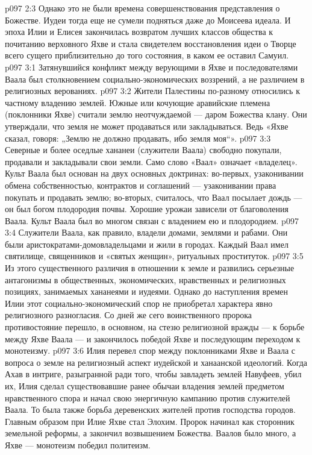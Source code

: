 \vs p097 2:3 Однако это не были времена совершенствования представления о Божестве. Иудеи тогда еще не сумели подняться даже до Моисеева идеала. И эпоха Илии и Елисея закончилась возвратом лучших классов общества к почитанию верховного Яхве и стала свидетелем восстановления идеи о Творце всего сущего приблизительно до того состояния, в каком ее оставил Самуил.
\vs p097 3:1 Затянувшийся конфликт между верующими в Яхве и последователями Ваала был столкновением социально\hyp{}экономических воззрений, а не различием в религиозных верованиях.
\vs p097 3:2 \pc Жители Палестины по\hyp{}разному относились к частному владению землей. Южные или кочующие аравийские племена (поклонники Яхве) считали землю неотчуждаемой --- даром Божества клану. Они утверждали, что земля не может продаваться или закладываться. Ведь «Яхве сказал, говоря: „Землю не должно продавать, ибо земля моя“».
\vs p097 3:3 Северные и более оседлые хананеи (служители Ваала) свободно покупали, продавали и закладывали свои земли. Само слово «Ваал» означает «владелец». Культ Ваала был основан на двух основных доктринах: во\hyp{}первых, узаконивании обмена собственностью, контрактов и соглашений --- узаконивании права покупать и продавать землю; во\hyp{}вторых, считалось, что Ваал посылает дождь --- он был богом плодородия почвы. Хорошие урожаи зависели от благоволения Ваала. Культ Ваала был во многом связан с  владением ею и плодородием.
\vs p097 3:4 Служители Ваала, как правило, владели домами, землями и рабами. Они были аристократами\hyp{}домовладельцами и жили в городах. Каждый Ваал имел святилище, священников и «святых женщин», ритуальных проституток.
\vs p097 3:5 Из этого существенного различия в отношении к земле и развились серьезные антагонизмы в общественных, экономических, нравственных и религиозных позициях, занимаемых хананеями и иудеями. Однако до наступления времен Илии этот социально\hyp{}экономический спор не приобретал характера явно религиозного разногласия. Со дней же сего воинственного пророка противостояние перешло, в основном, на стезю религиозной вражды --- к борьбе между Яхве  Ваала --- и закончилось победой Яхве и последующим переходом к монотеизму.
\vs p097 3:6 Илия перевел спор между поклонниками Яхве и Ваала с вопроса о земле на религиозный аспект иудейской и ханаанской идеологий. Когда Ахав в интриге, разыгранной ради того, чтобы завладеть землей Навуфеев, убил их, Илия сделал существовавшие ранее обычаи владения землей предметом нравственного спора и начал свою энергичную кампанию против служителей Ваала. То была также борьба деревенских жителей против господства городов. Главным образом при Илие Яхве стал Элохим. Пророк начинал как сторонник земельной реформы, а закончил возвышением Божества. Ваалов было много, а Яхве ---  монотеизм победил политеизм.
